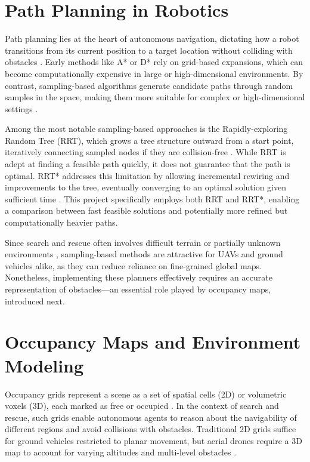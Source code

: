 \documentclass[12pt,a4paper]{report}
\begin{document}
\section{Path Planning in Robotics}
\label{sec:path_planning_robotics}
Path planning lies at the heart of autonomous navigation, dictating how a robot transitions from its
current position to a target location without colliding with obstacles \cite{Orthey2024SBMPReview}. Early methods
like A* or D* rely on grid-based expansions, which can become computationally expensive in large or
high-dimensional environments. By contrast, sampling-based algorithms generate
candidate paths through random samples in the space, making them more suitable for complex or
high-dimensional settings \cite{Orthey2024SBMPReview}.

Among the most notable sampling-based approaches is the Rapidly-exploring Random Tree (RRT), which
grows a tree structure outward from a start point, iteratively connecting sampled nodes if they are
collision-free \cite{LaValle2001RRT}. While RRT is adept at finding a feasible path quickly, it does not
guarantee that the path is optimal. RRT* addresses this limitation by allowing incremental rewiring
and improvements to the tree, eventually converging to an optimal solution given sufficient time
\cite{Karaman2011RRTstar}. This project specifically employs both RRT and RRT*, enabling a comparison between
fast feasible solutions and potentially more refined but computationally heavier paths.

Since search and rescue often involves difficult terrain or partially unknown environments \cite{Zhang2024ShrinkingPOMCP,Oleynikova2018ReplanDynamic},
sampling-based methods are attractive for UAVs and ground vehicles alike, as they can reduce reliance
on fine-grained global maps. Nonetheless, implementing these
planners effectively requires an accurate representation of obstacles—an essential role played by
occupancy maps, introduced next.

\section{Occupancy Maps and Environment Modeling}
\label{sec:occ_maps_env_modeling}
Occupancy grids represent a scene as a set of spatial cells (2D) or volumetric voxels (3D), each
marked as free or occupied \cite{Elfes1989OccupancyGrid,Raja2024OGMCBF}. In the context of search and rescue, such grids
enable autonomous agents to reason about the navigability of different regions and avoid collisions
with obstacles. Traditional 2D grids suffice for ground vehicles restricted to planar movement, but
aerial drones require a 3D map to account for varying altitudes and multi-level obstacles 
\cite{Merei2025UAVObstacleSurvey}.
\end{document}
